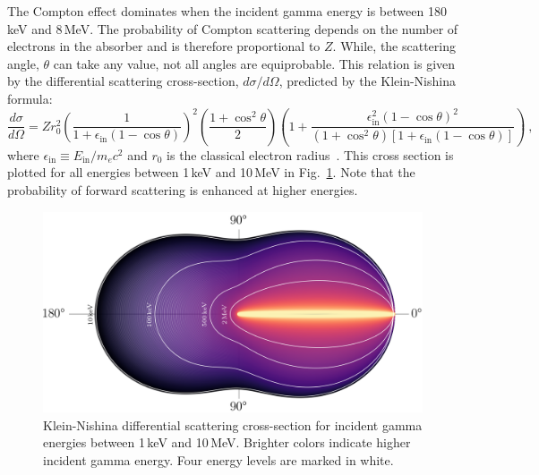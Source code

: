 The Compton effect dominates when the incident gamma energy is between 180\,keV and 8\,MeV. The probability of Compton scattering depends on the number of electrons in the absorber and is therefore proportional to $Z$. While, the scattering angle, $\theta$ can take any value, not all angles are equiprobable. This relation is given by the differential scattering cross-section, $d\sigma/d\Omega$, predicted by the Klein-Nishina formula:
\begin{equation}
	\frac{d\sigma}{d\Omega} = Zr_0^2\left(\frac{1}{1+\epsilon_\text{in}(1 - \cos\theta)}\right)^2 \left(\frac{1 + \cos^2\theta}{2}\right) \left(1 + \frac{\epsilon_\text{in}^2(1-\cos\theta)^2}{(1+\cos^2\theta)\left[1+\epsilon_\text{in}(1-\cos\theta)\right]}\right)~,
	\label{eq:klein-nishina}
\end{equation}
where $\epsilon_\text{in} \equiv E_\text{in}/m_ec^2$ and $r_0$ is the classical electron radius~\cite{klein-nishina}. This cross section is plotted for all energies between 1\,keV and 10\,MeV in Fig.~\ref{fig:klein-nishina}. Note that the probability of forward scattering is enhanced at higher energies. 

\begin{figure}[htb]
	\centering
	\includegraphics[width=5in]{figs/gammas/klein_nishina_width_5in.png}
	\caption{Klein-Nishina differential scattering cross-section for incident gamma energies between 1\,keV and 10\,MeV. Brighter colors indicate higher incident gamma energy. Four energy levels are marked in white.}
	\label{fig:klein-nishina}
\end{figure}

